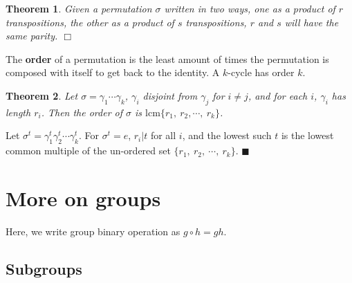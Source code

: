 \documentclass[letter-paper]{tufte-book}
\newtheorem{theorem}{\color{pastel-blue}Theorem}[section]
\newenvironment{proof}[1][Proof]{\begin{trivlist}
\item[\hskip \labelsep {\bfseries #1}]}{\end{trivlist}}
\newcommand\Def[1]{\textbf{#1}}
\newcommand{\qed}{\hfill$\blacksquare$}
\newcommand{\qedwhite}{\hfill \ensuremath{\Box}}
\begin{document}
\begin{theorem}
  Given a permutation $\sigma$ written in two ways, one as a product of $r$
  transpositions, the other as a product of $s$ transpositions, $r$ and $s$
  will have the same parity. \qedwhite
\end{theorem}
The \Def{order} of a permutation is the least amount of times the
permutation is composed with itself to get back to the identity. A $k$-cycle has 
order $k$.
\begin{theorem}
  Let $\sigma=\gamma_1\cdots\gamma_k$, $\gamma_i$ disjoint from $\gamma_j$
  for $i\neq j$, and for each $i$, $\gamma_i$ has length $r_i$. Then the order
  of $\sigma$ is $\mbox{lcm}\{r_1,\ r_2, \cdots,\ r_k\}$.
\end{theorem}
\begin{proof}
  Let $\sigma^t=\gamma_1^t \gamma_2^t \cdots \gamma_k^t$. For $\sigma^t=e$,
  $r_i |t$ for all $i$, and the lowest such $t$ is the lowest common multiple of 
  the un-ordered set $\{r_1,\ r_2,\ \cdots,\ r_k\}$. \qed
\end{proof}


\section{More on groups}

Here, we write group binary operation as $g\circ h=gh$.


\subsection{Subgroups}
\end{document}
